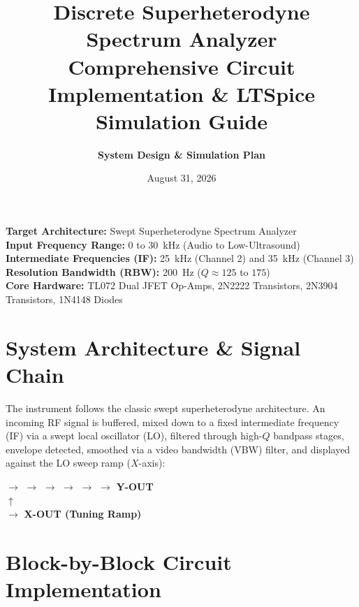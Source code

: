 \documentclass[11pt,a4paper]{article}
\title{
    \vspace{-1.5cm}
    {\Huge\bfseries\color{primary} Discrete Superheterodyne Spectrum Analyzer}\\[0.3cm]
    {\Large\color{darkgray} Comprehensive Circuit Implementation \& LTSpice Simulation Guide}
}
\author{\textbf{System Design \& Simulation Plan}}
\date{August 31, 2026}
\begin{document}
\maketitle
\thispagestyle{fancy}

\begin{tcolorbox}[colback=lightgray,colframe=primary,title=\textbf{Project Overview \& Scope}]
\textbf{Target Architecture:} Swept Superheterodyne Spectrum Analyzer\\
\textbf{Input Frequency Range:} 0 to 30~kHz (Audio to Low-Ultrasound)\\
\textbf{Intermediate Frequencies (IF):} 25~kHz (Channel 2) and 35~kHz (Channel 3)\\
\textbf{Resolution Bandwidth (RBW):} 200~Hz ($Q \approx 125$ to $175$)\\
\textbf{Core Hardware:} TL072 Dual JFET Op-Amps, 2N2222 Transistors, 2N3904 Transistors, 1N4148 Diodes
\end{tcolorbox}

\section{System Architecture \& Signal Chain}

The instrument follows the classic swept superheterodyne architecture. An incoming RF signal is buffered, mixed down to a fixed intermediate frequency (IF) via a swept local oscillator (LO), filtered through high-$Q$ bandpass stages, envelope detected, smoothed via a video bandwidth (VBW) filter, and displayed against the LO sweep ramp ($X$-axis):

\begin{center}
 $\longrightarrow$  $\longrightarrow$  $\longrightarrow$  $\longrightarrow$  $\longrightarrow$  $\longrightarrow$ \textbf{Y-OUT}\\
\vspace{0.2cm}
\hspace{4.2cm} $\uparrow$\\
\hspace{3.4cm}  $\longrightarrow$ \textbf{X-OUT (Tuning Ramp)}
\end{center}

\section{Block-by-Block Circuit Implementation}
\end{document}

